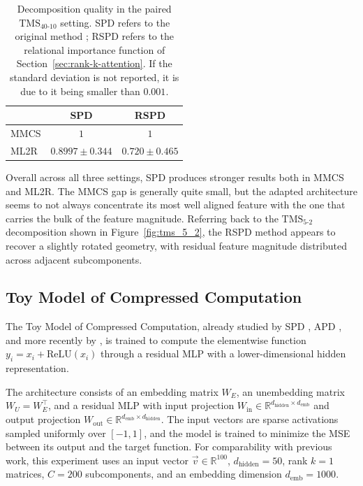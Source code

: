 \documentclass{article}
\begin{document}
\begin{table}[h!]
\centering
\renewcommand{\arraystretch}{1.2}
\begin{tabular}{lcc}
\toprule
& SPD & RSPD \\
\midrule
MMCS & $1$ & $1$ \\
ML2R & $0.8997 \pm 0.344$ & $0.720 \pm 0.465$ \\
\bottomrule
\end{tabular}
\caption{Decomposition quality in the paired $\mathrm{TMS}_{40\text{-}10}$ setting. SPD refers to the original method \autocite{stochasticparameterdecomposition}; RSPD refers to the relational importance function of Section~\ref{sec:rank-k-attention}. If the standard deviation is not reported, it is due to it being smaller than $0.001$.}
\label{tab:tms_results_paired}
\end{table}

Overall across all three settings,
SPD produces stronger results both in MMCS
and ML2R. The MMCS gap is generally quite small,
but the adapted architecture seems to not always
concentrate its most well aligned feature with the
one that carries the bulk of the feature magnitude.
Referring back to the $\mathrm{TMS}_{5\text{-}2}$ decomposition shown
in Figure~\ref{fig:tms_5_2}, the RSPD method appears to recover a
slightly rotated geometry, with residual feature magnitude distributed
across adjacent subcomponents.

\subsection{Toy Model of Compressed Computation}
\label{sec:tcc-experiment}
The Toy Model of Compressed Computation, already studied by SPD
\autocite{stochasticparameterdecomposition}, APD
\autocite{AttributionBasedParameterDecomposition}, and more recently by
\autocite{bhagat2025compressed}, is trained to compute the elementwise function
$y_i = x_i + \mathrm{ReLU}(x_i)$ through a residual MLP with a lower-dimensional
hidden representation.

The architecture consists of an embedding matrix $W_E$, an unembedding matrix
$W_U = W_E^\top$, and a residual MLP with input projection
$W_{\text{in}} \in \mathbb{R}^{d_{\text{hidden}} \times d_{\text{emb}}}$ and output projection
$W_{\text{out}} \in \mathbb{R}^{d_{\text{emb}} \times d_{\text{hidden}}}$. The input vectors are
sparse activations sampled uniformly over $[-1, 1]$, and the model is trained to
minimize the MSE between its output and the target function. For comparability with previous work, this experiment uses an input vector $\vec{v} \in \mathbb{R}^{100}$,
$d_{\text{hidden}} = 50$, rank $k=1$ matrices, $C = 200$ subcomponents, and an
embedding dimension $d_{\text{emb}} = 1000$.
\end{document}
